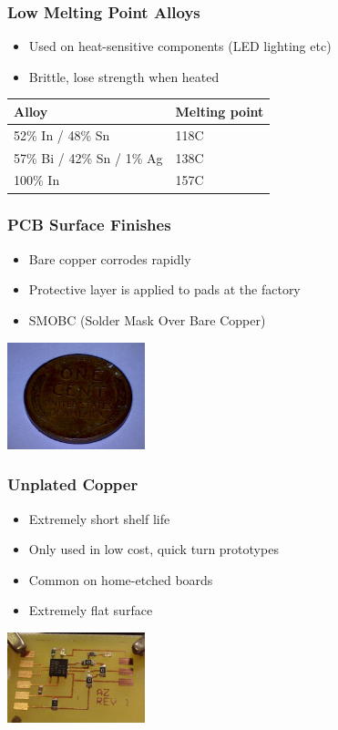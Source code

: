 \documentclass{beamer}
\begin{document}
\begin{frame}
\frametitle{Low Melting Point Alloys}
\begin{itemize}
\item Used on heat-sensitive components (LED lighting etc)
\item Brittle, lose strength when heated
\end{itemize}

\begin{tabularx}{\textwidth}{| X | X |}
\hline
\textbf{Alloy} & \textbf{Melting point}	\\ \hline
52\% In / 48\% Sn & 118C				\\ \hline
57\% Bi / 42\% Sn / 1\% Ag & 138C		\\ \hline
100\% In & 157C							\\ \hline
\end{tabularx}
\end{frame}

\begin{frame}
\frametitle{PCB Surface Finishes}
\begin{itemize}
\item Bare copper corrodes rapidly
\item Protective layer is applied to pads at the factory
\item SMOBC (Solder Mask Over Bare Copper)
\end{itemize}
\begin{center}
\includegraphics[width=4cm,keepaspectratio]{oxidized-copper.jpg}
\end{center}
\end{frame}

\begin{frame}
\frametitle{Unplated Copper}
\begin{itemize}
\item Extremely short shelf life
\item Only used in low cost, quick turn prototypes
\item Common on home-etched boards
\item Extremely flat surface
\end{itemize}
\begin{center}
\includegraphics[width=4cm,keepaspectratio]{no-plating.jpg}
\end{center}
\end{frame}
\end{document}
